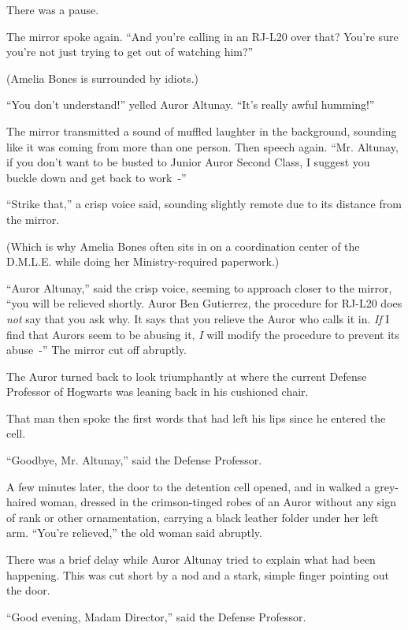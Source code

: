 There was a pause.

The mirror spoke again. ``And you're calling in an RJ-L20 over that? You're sure you're not just trying to get out of watching him?''

(Amelia Bones is surrounded by idiots.)

``You don't understand!'' yelled Auror Altunay. ``It's really awful humming!''

The mirror transmitted a sound of muffled laughter in the background, sounding like it was coming from more than one person. Then speech again. ``Mr. Altunay, if you don't want to be busted to Junior Auror Second Class, I suggest you buckle down and get back to work~-''

``Strike that,'' a crisp voice said, sounding slightly remote due to its distance from the mirror.

(Which is why Amelia Bones often sits in on a coordination center of the D.M.L.E. while doing her Ministry-required paperwork.)

``Auror Altunay,'' said the crisp voice, seeming to approach closer to the mirror, ``you will be relieved shortly. Auror Ben Gutierrez, the procedure for RJ-L20 does \emph{not} say that you ask why. It says that you relieve the Auror who calls it in. \emph{If} I find that Aurors seem to be abusing it, \emph{I} will modify the procedure to prevent its abuse~-'' The mirror cut off abruptly.

The Auror turned back to look triumphantly at where the current Defense Professor of Hogwarts was leaning back in his cushioned chair.

That man then spoke the first words that had left his lips since he entered the cell.

``Goodbye, Mr. Altunay,'' said the Defense Professor.

A few minutes later, the door to the detention cell opened, and in walked a grey-haired woman, dressed in the crimson-tinged robes of an Auror without any sign of rank or other ornamentation, carrying a black leather folder under her left arm. ``You're relieved,'' the old woman said abruptly.

There was a brief delay while Auror Altunay tried to explain what had been happening. This was cut short by a nod and a stark, simple finger pointing out the door.

``Good evening, Madam Director,'' said the Defense Professor.

